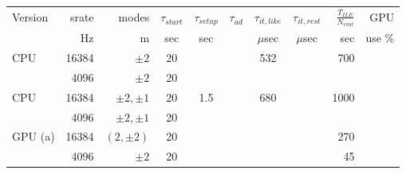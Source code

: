 \documentclass[twocolumn,prd,nofootinbib]{revtex4}
\begin{document}
\begin{table}
\begin{tabular}{lrr|ccccc|rr}
Version & srate & modes & $\tau_{start}$ & $\tau_{setup}$ & $\tau_{ad}$ & $\tau_{it,like}$ &$\tau_{it,rest}$ &
$\frac{T_{ILE}}{N_{eval}}$ & GPU \\  %
  &   Hz & m & sec & sec & & $\mu$sec & $\mu$sec  &sec  & use  \%\\ \hline 
CPU & 16384 & $\pm 2 $ & 20 & &&532 & &  700  \\ 
       & 4096 & $\pm 2 $ &   20 \\ \hline
%    
CPU & 16384 & $\pm 2,\pm 1 $ & 20 & 1.5 && 680 & &  1000  \\ 
       & 4096 & $ \pm 2, \pm 1 $ &   20 \\ \hline
GPU (a) & 16384 & $(2,\pm 2) $  & 20  & & && & 270 \\
            & 4096 &$\pm 2 $  &  20 &  & & && 45 \\ \hline

\end{tabular}
\end{table}
\end{document}
